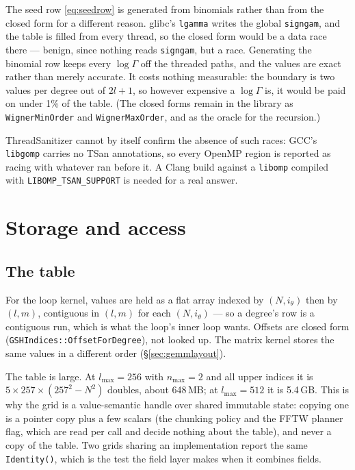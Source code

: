 \documentclass[11pt,a4paper]{article}
\newcommand{\code}[1]{\texttt{#1}}
\begin{document}
The seed row \eqref{eq:seedrow} is generated from binomials rather than
from the closed form for a different reason.  glibc's \code{lgamma} writes
the global \code{signgam}, and the table is filled from every thread, so
the closed form would be a data race there --- benign, since nothing reads
\code{signgam}, but a race.  Generating the binomial row keeps every
$\log\Gamma$ off the threaded paths, and the values are exact rather than
merely accurate.  It costs nothing measurable: the boundary is two values
per degree out of $2l+1$, so however expensive a $\log\Gamma$ is, it would
be paid on under 1\% of the table.  (The closed forms remain in the
library as \code{WignerMinOrder} and \code{WignerMaxOrder}, and as the
oracle for the recursion.)

ThreadSanitizer cannot by itself confirm the absence of such races: GCC's
\code{libgomp} carries no TSan annotations, so every OpenMP region is
reported as racing with whatever ran before it.  A Clang build against a
\code{libomp} compiled with \code{LIBOMP\_TSAN\_SUPPORT} is needed for a
real answer.

\section{Storage and access}
\label{sec:storage}

\subsection{The table}

For the loop kernel, values are held as a flat array indexed by
$(N, i_\theta)$ then by $(l,m)$, contiguous in $(l,m)$ for each
$(N,i_\theta)$ --- so a degree's row is a contiguous run, which is what
the loop's inner loop wants.  Offsets are closed form
(\code{GSHIndices::OffsetForDegree}), not looked up.  The matrix kernel
stores the same values in a different order (\S\ref{sec:gemmlayout}).

The table is large.  At $l_{\max}=256$ with $n_{\max}=2$ and all upper
indices it is $5\times 257\times(257^2-N^2)$ doubles, about 648\,MB; at
$l_{\max}=512$ it is 5.4\,GB.  This is why the grid is a value-semantic
handle over shared immutable state: copying one is a pointer copy plus a
few scalars (the chunking policy and the FFTW planner flag, which are read
per call and decide nothing about the table), and never a copy of the
table.  Two grids sharing an implementation report the same
\code{Identity()}, which is the test the field layer makes when it
combines fields.
\end{document}
